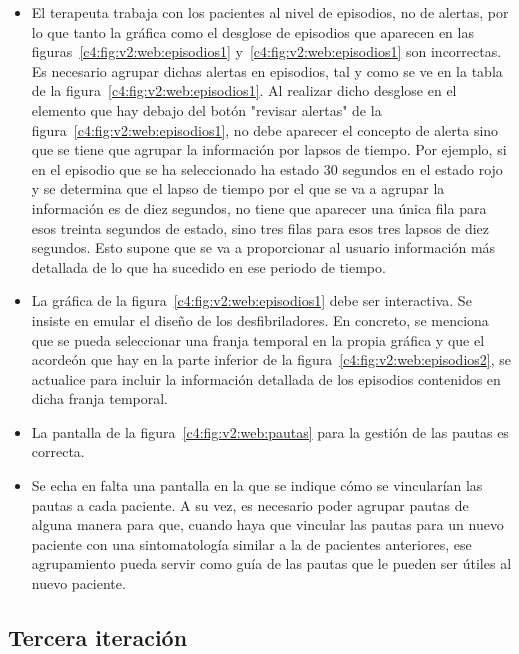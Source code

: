 \begin{itemize}
    \item El terapeuta trabaja con los pacientes al nivel de episodios, no de alertas, por lo que tanto la gráfica como el desglose de episodios que aparecen en las figuras~\ref{c4:fig:v2:web:episodios1} y~\ref{c4:fig:v2:web:episodios1} son incorrectas. Es necesario agrupar dichas alertas en episodios, tal y como se ve en la tabla de la figura~\ref{c4:fig:v2:web:episodios1}. Al realizar dicho desglose en el elemento que hay debajo del botón "revisar alertas" de la figura~\ref{c4:fig:v2:web:episodios1}, no debe aparecer el concepto de alerta sino que se tiene que agrupar la información por lapsos de tiempo. Por ejemplo, si en el episodio que se ha seleccionado ha estado 30 segundos en el estado rojo y se determina que el lapso de tiempo por el que se va a agrupar la información es de diez segundos, no tiene que aparecer una única fila para esos treinta segundos de estado, sino tres filas para esos tres lapsos de diez segundos. Esto supone que se va a proporcionar al usuario información más detallada de lo que ha sucedido en ese periodo de tiempo.
    
    \item La gráfica de la figura~\ref{c4:fig:v2:web:episodios1} debe ser interactiva. Se insiste en emular el diseño de los desfibriladores. En concreto, se menciona que se pueda seleccionar una franja temporal en la propia gráfica y que el acordeón que hay en la parte inferior de la figura~\ref{c4:fig:v2:web:episodios2}, se actualice para incluir la información detallada de los episodios contenidos en dicha franja temporal.
    
    \item La pantalla de la figura~\ref{c4:fig:v2:web:pautas} para la gestión de las pautas es correcta.
    \item Se echa en falta una pantalla en la que se indique cómo se vincularían las pautas a cada paciente. A su vez, es necesario poder agrupar pautas de alguna manera para que, cuando haya que vincular las pautas para un nuevo paciente con una sintomatología similar a la de pacientes anteriores, ese agrupamiento pueda servir como guía de las pautas que le pueden ser útiles al nuevo paciente.
\end{itemize}

\subsection{Tercera iteración}
